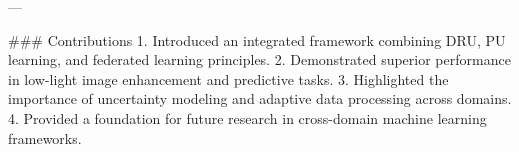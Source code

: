 ---

### Contributions
1. Introduced an integrated framework combining DRU, PU learning, and federated learning principles.
2. Demonstrated superior performance in low-light image enhancement and predictive tasks.
3. Highlighted the importance of uncertainty modeling and adaptive data processing across domains.
4. Provided a foundation for future research in cross-domain machine learning frameworks.